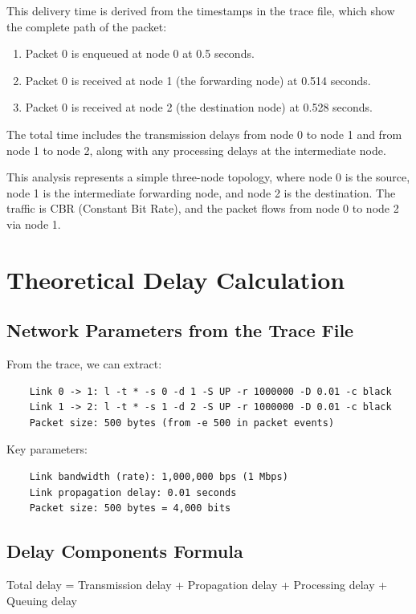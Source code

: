 \documentclass[12pt]{article}
\begin{document}
		\noindent		
		This delivery time is derived from the timestamps in the trace file, which show the complete path of the packet:
		
		\begin{enumerate}
			\item Packet 0 is enqueued at node 0 at 0.5 seconds.
			\item Packet 0 is received at node 1 (the forwarding node) at 0.514 seconds.
			\item Packet 0 is received at node 2 (the destination node) at 0.528 seconds.
		\end{enumerate}
		
		\noindent
		The total time includes the transmission delays from node 0 to node 1 and from node 1 to node 2, along with any processing delays at the intermediate node.
		
		\noindent
		\newline
		This analysis represents a simple three-node topology, where node 0 is the source, node 1 is the intermediate forwarding node, and node 2 is the destination. The traffic is CBR (Constant Bit Rate), and the packet flows from node 0 to node 2 via node 1.
	
	\section{Theoretical Delay Calculation}
	\subsection{Network Parameters from the Trace File}
	
	From the trace, we can extract:
	\begin{verbatim}
	Link 0 -> 1: l -t * -s 0 -d 1 -S UP -r 1000000 -D 0.01 -c black
	Link 1 -> 2: l -t * -s 1 -d 2 -S UP -r 1000000 -D 0.01 -c black
	Packet size: 500 bytes (from -e 500 in packet events)
	\end{verbatim}
	Key parameters:
	\begin{verbatim}
	Link bandwidth (rate): 1,000,000 bps (1 Mbps)
	Link propagation delay: 0.01 seconds
	Packet size: 500 bytes = 4,000 bits
	\end{verbatim}
	
	
	\subsection{Delay Components Formula}
	Total delay = Transmission delay + Propagation delay + Processing delay + Queuing delay
	
\end{document}
